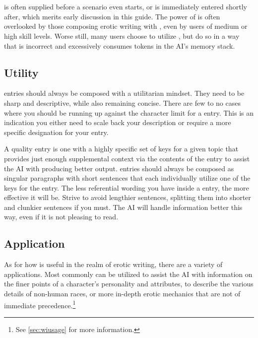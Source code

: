 \documentclass[Source-main.tex]{subfiles}
\begin{document}
\chapter{\wi}
\label{ch:wi}

\wi is often supplied before a scenario even starts, or is immediately entered shortly after, which merits early discussion in this guide.
The power of \wi is often overlooked by those composing erotic writing with \aid, even by users of medium or high skill levels.
Worse still, many users choose to utilize \wi, but do so in a way that is incorrect and excessively consumes tokens in the AI’s memory stack.

\section{Utility}
\label{sec:wiutility}

\wi entries should always be composed with a utilitarian mindset.
They need to be sharp and descriptive, while also remaining concise.
There are few to no cases where you should be running up against the character limit for a \wi entry.
This is an indication you either need to scale back your description or require a more specific designation for your entry.

A quality \wi entry is one with a highly specific set of keys for a given topic that provides just enough supplemental context via the contents of the entry to assist the AI with producing better output.
\wi entries should always be composed as singular paragraphs with short sentences that each individually utilize one of the keys for the entry.
The less referential wording you have inside a \wi entry, the more effective it will be.
Strive to avoid lengthier sentences, splitting them into shorter and clunkier sentences if you must.
The AI will handle information better this way, even if it is not pleasing to read.

\section{Application}
\label{sec:wiapplication}

As for how \wi is useful in the realm of erotic writing, there are a variety of applications.
Most commonly \wi can be utilized to assist the AI with information on the finer points of a character’s personality and attributes, to describe the various details of non-human races, or more in-depth erotic mechanics that are not of immediate precedence.\footnote{See \cref{sec:wiusage} for more information.}
\end{document}
